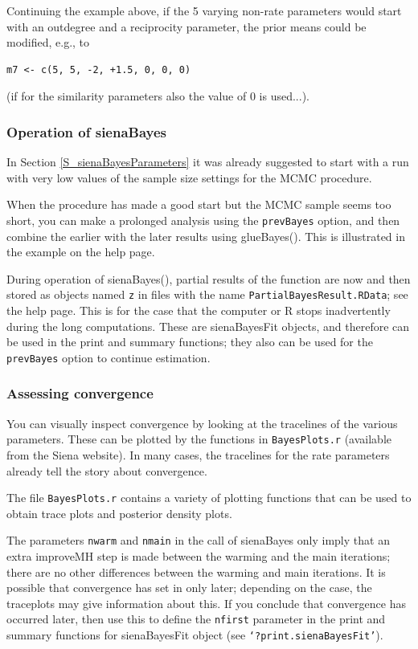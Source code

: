 \documentclass[a4paper,fleqn,11pt]{article}
\newcommand{\+}{\, + \,}
\newcommand{\sfn}[1]{\textsf{#1}}
\newcommand{\R}{{\sf R }}
\begin{document}
Continuing the example above, if the 5 varying non-rate parameters would
start with an outdegree and a reciprocity parameter, the prior means
could be modified, e.g., to
\begin{verbatim}
m7 <- c(5, 5, -2, +1.5, 0, 0, 0)
\end{verbatim}
(if for the similarity parameters also the value of 0 is used...).


\subsubsection{Operation of \sfn{sienaBayes}}

In Section \ref{S_sienaBayesParameters} it was already suggested to
start with a run with very low values of the sample size settings for the
MCMC procedure.

When the procedure has made a good start but the MCMC sample seems too
short, you can make a prolonged analysis using the \texttt{prevBayes} option,
and then combine the earlier with the later results using \sfn{glueBayes()}.
This is illustrated in the example on the help page.

During operation of \sfn{sienaBayes()}, partial results of the function
are now and then stored
as objects named \texttt{z} in files with the name
\texttt{PartialBayesResult.RData}; see the help page.
This is for the case that the computer or \R stops inadvertently
during the long computations.
These are \sfn{sienaBayesFit} objects, and therefore can be used in the
\sfn{print} and \sfn{summary} functions; they also can be used for
the \texttt{prevBayes} option to continue estimation.

\subsubsection{Assessing convergence}

You can visually inspect convergence by looking at the tracelines of the
various parameters. These can be plotted by the functions in \texttt{BayesPlots.r}
(available from the Siena website). In many cases, the tracelines for
the rate parameters already tell the story about convergence.

The file \texttt{BayesPlots.r} contains a variety of plotting functions that
can be used to obtain trace plots and posterior density plots.

The parameters \texttt{nwarm} and \texttt{nmain} in the call of
\sfn{sienaBayes} only imply
that an extra \sfn{improveMH} step is made between the warming and the
main iterations; there are no other differences between the warming
and main iterations. It is possible that convergence has set in only
later; depending on the case, the traceplots may give information about this.
If you conclude that convergence has occurred later, then use this to
define the \texttt{nfirst} parameter in the \sfn{print} and
\sfn{summary} functions for
\sfn{sienaBayesFit} object (see \texttt{`?print.sienaBayesFit'}).
\end{document}
